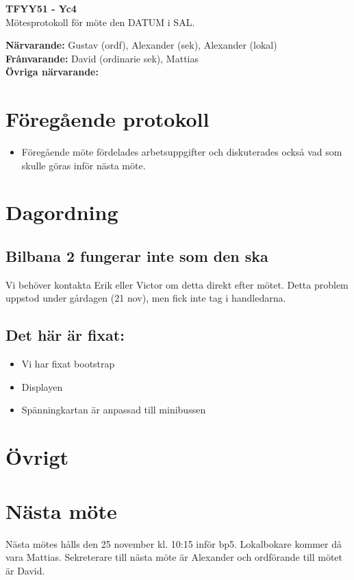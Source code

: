 \documentclass[11pt,a4paper]{article}
\begin{document}
    \begin{center}
        \textbf{\Large TFYY51 - Yc4} \\[0.2em]
        Mötesprotokoll för möte den DATUM i SAL.
    \end{center}
    \vspace{1em}
    \textbf{Närvarande:} Gustav (ordf), Alexander (sek), Alexander (lokal) \\[0.5em]
    \textbf{Frånvarande:} David (ordinarie sek), Mattias \\[0.5em]  %
    \textbf{Övriga närvarande:}

    \section*{Föregående protokoll}
    \begin{itemize}
        \item Föregående möte fördelades arbetsuppgifter och diskuterades också vad som skulle göras inför nästa möte.\
    \end{itemize}

    \section*{Dagordning}
    \subsection*{Bilbana 2 fungerar inte som den ska}
	    Vi behöver kontakta Erik eller Victor om detta direkt efter mötet. Detta problem uppstod under gårdagen (21 nov), men fick inte tag i handledarna.
	    \subsection*{Det här är fixat:}
	     
	    \begin{itemize}
	    	\item Vi har fixat bootstrap
	    	\item Displayen
	    	\item Spänningkartan är anpassad till minibussen
	    \end{itemize}
    \section*{Övrigt}
    

    \section*{Nästa möte}
    Nästa mötes hålls den 25 november kl. 10:15 inför bp5. Lokalbokare kommer då vara Mattias. Sekreterare till nästa möte är Alexander och ordförande till mötet är David.  
\end{document}
